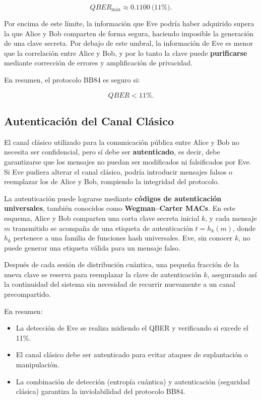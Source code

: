 \documentclass[12pt]{article}
\begin{document}
\[
QBER_{\text{máx}} \approx 0.1100 \ \text{(11\%)}.
\]

Por encima de este límite, la información que Eve podría haber adquirido supera la que 
Alice y Bob comparten de forma segura, haciendo imposible la generación de una clave secreta.  
Por debajo de este umbral, la información de Eve es menor que la correlación entre 
Alice y Bob, y por lo tanto la clave puede \textbf{purificarse} mediante corrección de errores 
y amplificación de privacidad.

En resumen, el protocolo BB84 es seguro si:

\[
QBER < 11\%.
\]

\subsection{Autenticación del Canal Clásico}

El canal clásico utilizado para la comunicación pública entre Alice y Bob no necesita ser 
confidencial, pero sí debe ser \textbf{autenticado}, es decir, debe garantizarse que los 
mensajes no puedan ser modificados ni falsificados por Eve.  
Si Eve pudiera alterar el canal clásico, podría introducir mensajes falsos o reemplazar 
los de Alice y Bob, rompiendo la integridad del protocolo.

La autenticación puede lograrse mediante \textbf{códigos de autenticación universales}, 
también conocidos como \textbf{Wegman--Carter MACs}.  
En este esquema, Alice y Bob comparten una corta clave secreta inicial $k$, y cada mensaje 
$m$ transmitido se acompaña de una etiqueta de autenticación $t = h_k(m)$, donde 
$h_k$ pertenece a una familia de funciones hash universales.  
Eve, sin conocer $k$, no puede generar una etiqueta válida para un mensaje falso.

Después de cada sesión de distribución cuántica, una pequeña fracción de la nueva clave 
se reserva para reemplazar la clave de autenticación $k$, asegurando así la continuidad 
del sistema sin necesidad de recurrir nuevamente a un canal precompartido.

En resumen:
\begin{itemize}
    \item La detección de Eve se realiza midiendo el QBER y verificando si excede el 11\%.
    \item El canal clásico debe ser autenticado para evitar ataques de suplantación o manipulación.
    \item La combinación de detección (entropía cuántica) y autenticación (seguridad clásica) 
          garantiza la inviolabilidad del protocolo BB84.
\end{itemize}
\end{document}
